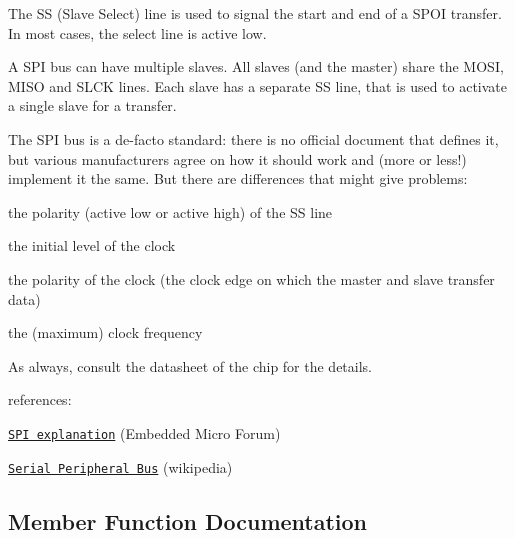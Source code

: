 The SS (Slave Select) line is used to signal the start and end of a S\+P\+OI transfer. In most cases, the select line is active low.



A S\+PI bus can have multiple slaves. All slaves (and the master) share the M\+O\+SI, M\+I\+SO and S\+L\+CK lines. Each slave has a separate SS line, that is used to activate a single slave for a transfer.



The S\+PI bus is a de-\/facto standard\+: there is no official document that defines it, but various manufacturers agree on how it should work and (more or less!) implement it the same. But there are differences that might give problems\+:
\begin{DoxyItemize}
\item the polarity (active low or active high) of the SS line
\item the initial level of the clock
\item the polarity of the clock (the clock edge on which the master and slave transfer data)
\item the (maximum) clock frequency
\end{DoxyItemize}

As always, consult the datasheet of the chip for the details.

references\+:
\begin{DoxyItemize}
\item \href{https://embeddedmicro.com/tutorials/mojo/serial-peripheral-interface-spi}{\tt S\+PI explanation} (Embedded Micro Forum)
\item \href{https://en.wikipedia.org/wiki/Serial_Peripheral_Interface_Bus}{\tt Serial Peripheral Bus} (wikipedia) 
\end{DoxyItemize}

\subsection{Member Function Documentation}
